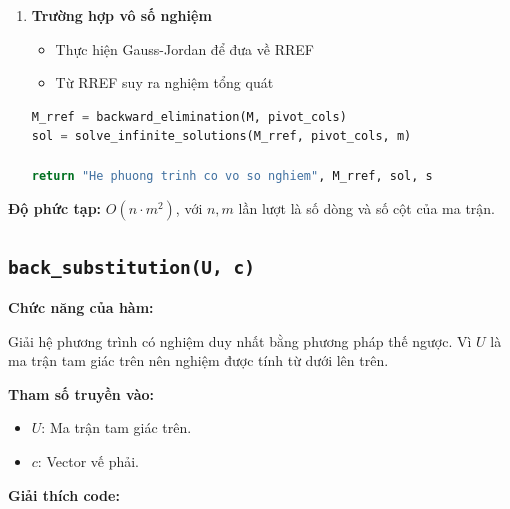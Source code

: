 \documentclass[a4paper,12pt]{report}
\begin{document}
\begin{enumerate}
\item \textbf{Trường hợp vô số nghiệm}

\begin{itemize}
    \item Thực hiện Gauss-Jordan để đưa về RREF
    \item Từ RREF suy ra nghiệm tổng quát
\end{itemize}

\begin{lstlisting}[language=Python, caption={Vô số nghiệm}]
M_rref = backward_elimination(M, pivot_cols)
sol = solve_infinite_solutions(M_rref, pivot_cols, m)

return "He phuong trinh co vo so nghiem", M_rref, sol, s
\end{lstlisting}

\end{enumerate}
\textbf{Độ phức tạp:} $O(n \cdot m^2)$, với $n, m$ lần lượt là số dòng và số cột của ma trận.

\subsection[back\_substitution(U, c)]{\texttt{back\_substitution(U, c)}}

\textbf{Chức năng của hàm:}

Giải hệ phương trình có nghiệm duy nhất bằng phương pháp thế ngược. Vì $U$ là ma trận tam giác trên nên nghiệm được tính từ dưới lên trên.

\smallskip

\noindent\textbf{Tham số truyền vào:}
\begin{itemize}
    \item $U$: Ma trận tam giác trên.
    \item $c$: Vector vế phải.
\end{itemize}

\smallskip

\noindent\textbf{Giải thích code:}
\end{document}
